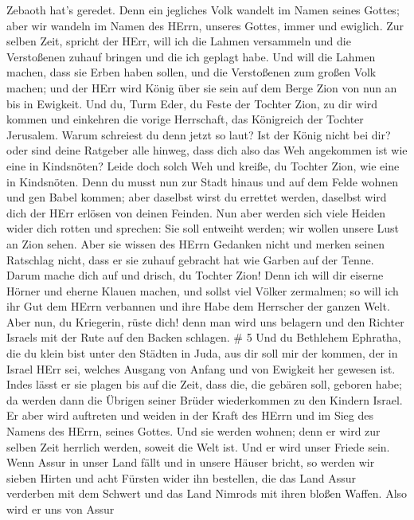 Zebaoth hat's geredet.  Denn ein jegliches Volk wandelt im
Namen seines Gottes; aber wir wandeln im Namen des HErrn, unseres
Gottes, immer und ewiglich.  Zur selben Zeit, spricht der
HErr, will ich die Lahmen versammeln und die Verstoßenen zuhauf bringen
und die ich geplagt habe.  Und will die Lahmen machen, dass
sie Erben haben sollen, und die Verstoßenen zum großen Volk machen; und
der HErr wird König über sie sein auf dem Berge Zion von nun an bis in
Ewigkeit.  Und du, Turm Eder, du Feste der Tochter Zion, zu
dir wird kommen und einkehren die vorige Herrschaft, das Königreich der
Tochter Jerusalem.  Warum schreiest du denn jetzt so laut?
Ist der König nicht bei dir? oder sind deine Ratgeber alle hinweg, dass
dich also das Weh angekommen ist wie eine in Kindsnöten? 
Leide doch solch Weh und kreiße, du Tochter Zion, wie eine in
Kindsnöten. Denn du musst nun zur Stadt hinaus und auf dem Felde wohnen
und gen Babel kommen; aber daselbst wirst du errettet werden, daselbst
wird dich der HErr erlösen von deinen Feinden.  Nun aber
werden sich viele Heiden wider dich rotten und sprechen: Sie soll
entweiht werden; wir wollen unsere Lust an Zion sehen. 
Aber sie wissen des HErrn Gedanken nicht und merken seinen Ratschlag
nicht, dass er sie zuhauf gebracht hat wie Garben auf der Tenne.
 Darum mache dich auf und drisch, du Tochter Zion! Denn ich
will dir eiserne Hörner und eherne Klauen machen, und sollst viel Völker
zermalmen; so will ich ihr Gut dem HErrn verbannen und ihre Habe dem
Herrscher der ganzen Welt.  Aber nun, du Kriegerin, rüste
dich! denn man wird uns belagern und den Richter Israels mit der Rute
auf den Backen schlagen. \# 5  Und du Bethlehem Ephratha,
die du klein bist unter den Städten in Juda, aus dir soll mir der
kommen, der in Israel HErr sei, welches Ausgang von Anfang und von
Ewigkeit her gewesen ist.  Indes lässt er sie plagen bis auf
die Zeit, dass die, die gebären soll, geboren habe; da werden dann die
Übrigen seiner Brüder wiederkommen zu den Kindern Israel. 
Er aber wird auftreten und weiden in der Kraft des HErrn und im Sieg des
Namens des HErrn, seines Gottes. Und sie werden wohnen; denn er wird zur
selben Zeit herrlich werden, soweit die Welt ist.  Und er
wird unser Friede sein. Wenn Assur in unser Land fällt und in unsere
Häuser bricht, so werden wir sieben Hirten und acht Fürsten wider ihn
bestellen,  die das Land Assur verderben mit dem Schwert und
das Land Nimrods mit ihren bloßen Waffen. Also wird er uns von Assur
